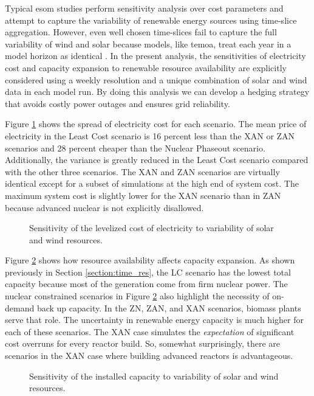 Typical \gls{esom} studies perform sensitivity analysis over cost parameters and
attempt to capture the variability of renewable energy sources using time-slice
aggregation. However, even well chosen time-slices fail to capture the full variability
of wind and solar because models, like \gls{temoa}, treat each year in a model
horizon as identical \cite{hunter_modeling_2013}. In the present analysis, the
sensitivities of electricity cost and capacity expansion to renewable resource
availability are explicitly considered using a weekly resolution and a unique combination
of solar and wind data in each model run. By doing this analysis we can develop
a hedging strategy that avoids costly power outages and ensures grid reliability.

Figure \ref{fig:obj_cost_plot} shows the spread of electricity cost for each scenario.
The mean price of electricity in the Least Cost scenario is 16 percent less than
the XAN or ZAN scenarios and 28 percent cheaper than the Nuclear Phaseout scenario.
Additionally, the variance is greatly reduced in the Least Cost scenario compared
with the other three scenarios. The XAN and ZAN scenarios are virtually identical
except for a subset of simulations at the high end of system cost. The maximum
system cost is slightly lower for the XAN scenario than in ZAN because advanced
nuclear is not explicitly disallowed.

\begin{figure}[H]
  \centering
  \resizebox{0.95\columnwidth}{!}{}
  \caption{Sensitivity of the levelized cost of electricity to variability of
   solar and wind resources.}
  \label{fig:obj_cost_plot}
\end{figure}

Figure \ref{fig:il_capacity} shows how resource availability affects capacity
expansion. As shown previously in Section \ref{section:time_res}, the LC scenario
has the lowest total capacity because most of the generation come from firm nuclear
power. The nuclear constrained scenarios in Figure \ref{fig:il_capacity} also
highlight the necessity of on-demand back up capacity. In the ZN, ZAN, and XAN
scenarios, biomass plants serve that role. The uncertainty in renewable energy
capacity is much higher for each of these scenarios.  The XAN case simulates the
\textit{expectation} of significant cost overruns for every reactor build. So,
somewhat surprisingly, there are scenarios in the XAN case where building
advanced reactors is advantageous.

\begin{figure}[H]
  \centering
  \resizebox{0.95\columnwidth}{!}{}
  \caption{Sensitivity of the installed capacity to variability of
   solar and wind resources.}
  \label{fig:il_capacity}
\end{figure}

